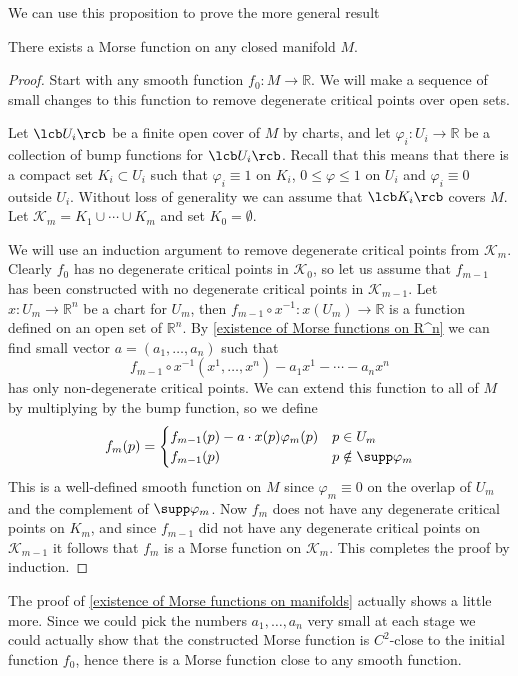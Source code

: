 We can use this proposition to prove the more general result
\begin{thm}
\label{existence of Morse functions on manifolds}
There exists a Morse function on any closed manifold $M$.
\end{thm}
\begin{proof}
Start with any smooth function $f_0 : M \rightarrow \mathbb R$. We will make a sequence of small changes to this function to remove degenerate critical points over open sets.

Let $\lcb U_i \rcb$ be a finite open cover of $M$ by charts, and let $\varphi_i : U_i \rightarrow \mathbb R$ be a collection of bump functions for $\lcb U_i \rcb$. Recall that this means that there is a compact set $K_i \subset U_i$ such that $\varphi_i \equiv 1$ on $K_i$, $0 \leq \varphi \leq 1$ on $U_i$ and $\varphi_i \equiv 0$ outside $U_i$. Without loss of generality we can assume that $\lcb K_i \rcb$ covers $M$. Let $\mathcal K_m = K_1 \cup \cdots \cup K_m$ and set $K_0 = \emptyset$. 

We will use an induction argument to remove degenerate critical points from $\mathcal K_m$. Clearly $f_0$ has no degenerate critical points in $\mathcal K_0$, so let us assume that $f_{m-1}$ has been constructed with no degenerate critical points in $\mathcal K_{m-1}$. Let $x : U_m \rightarrow \mathbb R^n$ be a chart for $U_m$, then $f_{m-1} \circ x^{-1} : x(U_m) \rightarrow \mathbb R$ is a function defined on an open set of $\mathbb R^n$. By \cref{existence of Morse functions on R^n} we can find small vector $a=(a_1,\ldots,a_n)$ such that
\[ f_{m-1} \circ x^{-1}(x^1,\ldots,x^n) - a_1x^1 - \cdots - a_nx^n \]
has only non-degenerate critical points. We can extend this function to all of $M$ by multiplying by the bump function, so we define
\[ f_m(p) = \begin{cases} f_{m-1}(p) - a \cdot x(p) \varphi_m(p) & p \in U_m \\ f_{m-1}(p) & p \notin \supp \varphi_m \end{cases} \]
This is a well-defined smooth function on $M$ since $\varphi_m \equiv 0$ on the overlap of $U_m$ and the complement of $\supp \varphi_m$. Now $f_m$ does not have any degenerate critical points on $K_m$, and since $f_{m-1}$ did not have any degenerate critical points on $\mathcal K_{m-1}$ it follows that $f_m$ is a Morse function on $\mathcal K_m$. This completes the proof by induction.
\end{proof}

The proof of \cref{existence of Morse functions on manifolds} actually shows a little more. Since we could pick the numbers $a_1,\ldots,a_n$ very small at each stage we could actually show that the constructed Morse function is $C^2$-close to the initial function $f_0$, hence there is a Morse function close to any smooth function.


